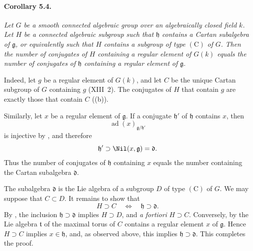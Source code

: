
\paragraph{\textbf{Corollary 5.4.}}
{\itshape Let \(G\) be a smooth connected algebraic group over an
algebraically closed field \(k\). Let \(H\) be a connected
algebraic subgroup such that \(\mathfrak h\) contains a Cartan
subalgebra of \(\mathfrak g\), or equivalently such that \(H\)
contains a subgroup of type \((\mathrm C)\) of \(G\). Then the
number of conjugates of \(H\) containing a regular element of
\(G(k)\) equals the number of conjugates of \(\mathfrak h\)
containing a regular element of \(\mathfrak g\).}

Indeed, let \(g\) be a regular element of \(G(k)\), and let \(C\)
be the unique Cartan subgroup of \(G\) containing \(g\)
\textup{(XIII~2)}. The conjugates of \(H\) that contain \(g\) are
exactly those that contain \(C\)
\textup{(\textup{(b)})}.

Similarly, let \(x\) be a regular element of \(\mathfrak g\). If a
conjugate \(\mathfrak h'\) of \(\mathfrak h\) contains \(x\), then
\[
  \operatorname{ad}(x)_{\mathfrak g/\mathfrak h'}
\]
is injective by , and therefore
\[
  \mathfrak h'\supset\Nil(x,\mathfrak g)=\mathfrak d.
\]
Thus the number of conjugates of \(\mathfrak h\) containing \(x\)
equals the number containing the Cartan subalgebra
\(\mathfrak d\).

The subalgebra \(\mathfrak d\) is the Lie algebra of a subgroup
\(D\) of type \((\mathrm C)\) of \(G\). We may suppose that
\(C\subset D\). It remains to show that
\[
  H\supset C\quad\Longleftrightarrow\quad
  \mathfrak h\supset\mathfrak d.
\]
By , the inclusion
\(\mathfrak h\supset\mathfrak d\) implies \(H\supset D\), and
\emph{a fortiori} \(H\supset C\). Conversely, by  the Lie
algebra \(\mathfrak t\) of the maximal torus of \(C\) contains a regular element \(x\)
of \(\mathfrak g\). Hence \(H\supset C\) implies
\(x\in\mathfrak h\), and, as observed above, this implies
\(\mathfrak h\supset\mathfrak d\). This completes the proof.

